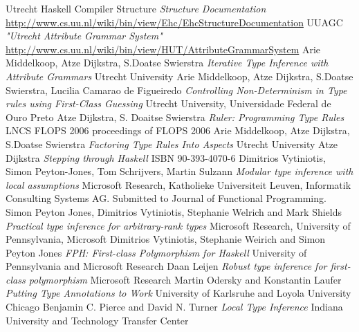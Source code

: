 \documentclass[12pt, a4paper, oneside]{article}
\begin{document}
\begin{thebibliography}{9}
  Utrecht Haskell Compiler Structure
  \emph{Structure Documentation}
   \url{http://www.cs.uu.nl/wiki/bin/view/Ehc/EhcStructureDocumentation}
  UUAGC
  \emph{"Utrecht Attribute Grammar System"}
   \url{http://www.cs.uu.nl/wiki/bin/view/HUT/AttributeGrammarSystem}
  Arie Middelkoop, Atze Dijkstra, S.Doatse Swierstra
  \emph{Iterative Type Inference with Attribute Grammars}
  Utrecht University
  Arie Middelkoop, Atze Dijkstra, S.Doatse Swierstra, Lucilia Camarao de Figueiredo
  \emph{Controlling Non-Determinism in Type rules using First-Class Guessing}
  Utrecht University, Universidade Federal de Ouro Preto
  Atze Dijkstra, S. Doaitse Swierstra 
  \emph{Ruler: Programming Type Rules}
  LNCS FLOPS 2006 proceedings of FLOPS 2006
  Arie Middelkoop, Atze Dijkstra, S.Doatse Swierstra
  \emph{Factoring Type Rules Into Aspects}
  Utrecht University
  Atze Dijkstra
  \emph{Stepping through Haskell}
  ISBN 90-393-4070-6
  Dimitrios Vytiniotis, Simon Peyton-Jones, Tom Schrijvers, Martin Sulzann
  \emph{Modular type inference with local assumptions}
  Microsoft Research, Katholieke Universiteit Leuven, Informatik Consulting Systems AG.
  Submitted to Journal of Functional Programming.
  Simon Peyton Jones, Dimitrios Vytiniotis, Stephanie Welrich and Mark Shields
  \emph{Practical type inference for arbitrary-rank types}
  Microsoft Research, University of Pennsylvania, Microsoft
  Dimitrios Vytiniotis, Stephanie Weirich and Simon Peyton Jones
  \emph{FPH: First-class Polymorphism for Haskell}
  University of Pennsylvania and Microsoft Research
  Daan Leijen
  \emph{Robust type inference for first-class polymorphism}
  Microsoft Research
  Martin Odersky and Konstantin Laufer
  \emph{Putting Type Annotations to Work}
  University of Karlsruhe and Loyola University Chicago
  Benjamin C. Pierce and David N. Turner
  \emph{Local Type Inference}
  Indiana University and Technology Transfer Center
\end{thebibliography}
\end{document}
